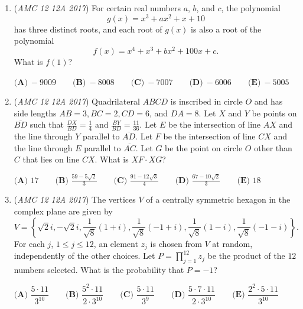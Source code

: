 \begin{enumerate}
 $\textbf{(A)}\ 4 \qquad \textbf{(B)}\ 5 \qquad\textbf{(C)}\ 7 \qquad\textbf{(D)}\ 15 \qquad\textbf{(E)}\ 39$


	\item (\textit{AMC 12 12A 2017}) For certain real numbers $a$, $b$, and $c$, the polynomial 
 \[g(x) = x^3 + ax^2 + x + 10\]has three distinct roots, and each root of $g(x)$ is also a root of the polynomial 
 \[f(x) = x^4 + x^3 + bx^2 + 100x + c.\]What is $f(1)$?


 $\textbf{(A)}\ -9009 \qquad\textbf{(B)}\ -8008 \qquad\textbf{(C)}\ -7007 \qquad\textbf{(D)}\ -6006 \qquad\textbf{(E)}\ -5005$


	\item (\textit{AMC 12 12A 2017}) Quadrilateral $ABCD$ is inscribed in circle $O$ and has side lengths $AB=3, BC=2, CD=6$, and $DA=8$. Let $X$ and $Y$ be points on $\overline{BD}$ such that $\frac{DX}{BD} = \frac{1}{4}$ and $\frac{BY}{BD} = \frac{11}{36}$. Let $E$ be the intersection of line $AX$ and the line through $Y$ parallel to $\overline{AD}$. Let $F$ be the intersection of line $CX$ and the line through $E$ parallel to $\overline{AC}$. Let $G$ be the point on circle $O$ other than $C$ that lies on line $CX$. What is $XF\cdot XG$?


 $\textbf{(A) }17\qquad\textbf{(B) }\frac{59 - 5\sqrt{2}}{3}\qquad\textbf{(C) }\frac{91 - 12\sqrt{3}}{4}\qquad\textbf{(D) }\frac{67 - 10\sqrt{2}}{3}\qquad\textbf{(E) }18$


	\item (\textit{AMC 12 12A 2017}) The vertices $V$ of a centrally symmetric hexagon in the complex plane are given by 
 \[V=\left\{   \sqrt{2}i,-\sqrt{2}i, \frac{1}{\sqrt{8}}(1+i),\frac{1}{\sqrt{8}}(-1+i),\frac{1}{\sqrt{8}}(1-i),\frac{1}{\sqrt{8}}(-1-i) \right\}.\] For each $j$, $1\leq j\leq 12$, an element $z_j$ is chosen from $V$ at random, independently of the other choices. Let $P={\prod}_{j=1}^{12}z_j$ be the product of the $12$ numbers selected. What is the probability that $P=-1$?


 $\textbf{(A) } \dfrac{5\cdot11}{3^{10}} \qquad \textbf{(B) } \dfrac{5^2\cdot11}{2\cdot3^{10}} \qquad \textbf{(C) } \dfrac{5\cdot11}{3^{9}} \qquad \textbf{(D) } \dfrac{5\cdot7\cdot11}{2\cdot3^{10}} \qquad \textbf{(E) } \dfrac{2^2\cdot5\cdot11}{3^{10}}$


\end{enumerate}